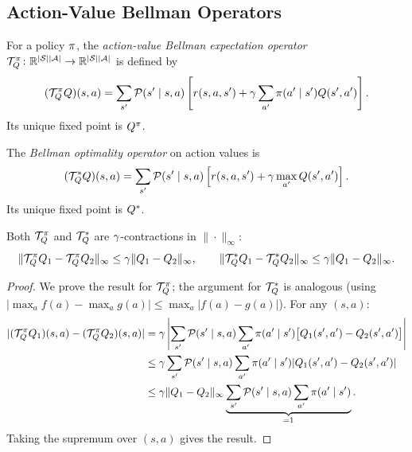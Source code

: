 \documentclass[11pt,a4paper]{article}
\begin{document}
\subsection{Action-Value Bellman Operators}
\label{subsec:bellman_q}

\begin{definition}
\label{def:bellman_q}
For a policy $\pi$, the \emph{action-value Bellman expectation
operator} $\mathcal{T}^\pi_Q \colon \mathbb{R}^{|\mathcal{S}||\mathcal{A}|}
\to \mathbb{R}^{|\mathcal{S}||\mathcal{A}|}$ is defined by
\begin{equation}
  (\mathcal{T}^\pi_Q Q)(s,a)
  = \sum_{s'} \mathcal{P}(s' \mid s,a) \left[
    r(s,a,s') + \gamma \sum_{a'} \pi(a' \mid s') Q(s',a')
  \right].
  \label{eq:bellman_q}
\end{equation}
Its unique fixed point is $Q^{\pi}$.
\end{definition}

\begin{definition}
\label{def:bellman_opt_q}
The \emph{Bellman optimality operator} on action values is
\begin{equation}
  (\mathcal{T}^*_Q Q)(s,a)
  = \sum_{s'} \mathcal{P}(s' \mid s,a) \left[
    r(s,a,s') + \gamma \max_{a'} Q(s',a')
  \right].
  \label{eq:bellman_opt_q}
\end{equation}
Its unique fixed point is $Q^*$.
\end{definition}

\begin{lemma}
\label{lem:bellman_q_contraction}
Both $\mathcal{T}^\pi_Q$ and $\mathcal{T}^*_Q$ are
$\gamma$-contractions in $\|\cdot\|_\infty$:
\begin{equation}
  \|\mathcal{T}^\pi_Q Q_1 - \mathcal{T}^\pi_Q Q_2\|_\infty
  \leq \gamma \|Q_1 - Q_2\|_\infty, \qquad
  \|\mathcal{T}^*_Q Q_1 - \mathcal{T}^*_Q Q_2\|_\infty
  \leq \gamma \|Q_1 - Q_2\|_\infty.
  \label{eq:q_contraction}
\end{equation}
\end{lemma}

\begin{proof}
We prove the result for $\mathcal{T}^\pi_Q$; the argument for
$\mathcal{T}^*_Q$ is analogous (using $|\max_a f(a) - \max_a g(a)|
\leq \max_a |f(a) - g(a)|$). For any $(s,a)$:
\begin{align}
  |(\mathcal{T}^\pi_Q Q_1)(s,a) - (\mathcal{T}^\pi_Q Q_2)(s,a)|
  &= \gamma \left|
    \sum_{s'} \mathcal{P}(s' \mid s,a) \sum_{a'} \pi(a' \mid s')
    \bigl[Q_1(s',a') - Q_2(s',a')\bigr]
  \right| \nonumber\\
  &\leq \gamma \sum_{s'} \mathcal{P}(s' \mid s,a) \sum_{a'}
    \pi(a' \mid s') |Q_1(s',a') - Q_2(s',a')| \nonumber\\
  &\leq \gamma \|Q_1 - Q_2\|_\infty
    \underbrace{\sum_{s'} \mathcal{P}(s' \mid s,a)
    \sum_{a'} \pi(a' \mid s')}_{= 1}.
  \label{eq:q_contraction_proof}
\end{align}
Taking the supremum over $(s,a)$ gives the result.
\end{proof}
\end{document}
